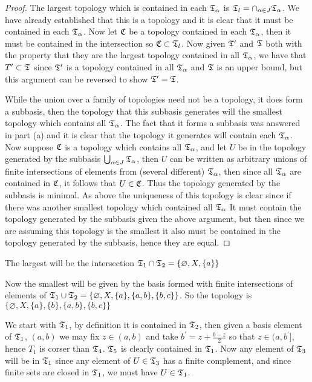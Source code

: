 \begin{alphaparts}
\begin{proof}
    The largest topology which is contained in each $\mathfrak{T}_\alpha$ is $\mathfrak{T}_l = \cap_{\alpha \in J } \mathfrak{T}_\alpha$. We have already established that this is a topology and it is clear that it must be contained in each $\mathfrak{T}_\alpha$. Now let $\mathfrak{C}$ be a topology 
    contained in each $\mathfrak{T}_\alpha$, then it must be contained in the intersection so $\mathfrak{C} \subset \mathfrak{T}_l$. Now given $\mathfrak{T}^\prime $ and $\mathfrak{T}$ both with the property that they are the largest topology contained in all $\mathfrak{T}_\alpha$, we have that 
    $T^\prime \subset \mathfrak{T}$ since $\mathfrak{T}^\prime$ is a topology contained in all $\mathfrak{T}_\alpha$ and $\mathfrak{T}$ is an upper bound, but this argument can be reversed to show $\mathfrak{T}^\prime = \mathfrak{T}$. 

    While the union over a family of topologies need not be a topology, it does form a subbasis, then the topology that this subbasis generates will the smallest topology which contains all $\mathfrak{T}_\alpha$. The fact that it forms a subbasis was answered in part (a) and 
    it is clear that the topology it generates will contain each $\mathfrak{T}_\alpha$. Now suppose $\mathfrak{C}$ is a topology which contains all $\mathfrak{T}_\alpha$, and let $U$ be in the topology generated by the subbasis $\bigcup_{\alpha \in J} \mathfrak{T}_\alpha$, then $U$ can be written as 
    arbitrary unions of finite intersections of elements from (several different) $\mathfrak{T}_\alpha$, then since all $\mathfrak{T}_\alpha$ are contained in $\mathfrak{C}$, it follows that $U \in \mathfrak{C}$. Thus the topology generated by the subbasis is minimal. As above the uniqueness of this topology is 
    clear since if there was another smallest topology which contained all $\mathfrak{T}_\alpha$ It must contain the topology generated by the subbasis given the above argument, but then since we are assuming this topology is the smallest it also must be contained in the topology generated by 
    the subbasis, hence they are equal. 
\end{proof}

\questionpart
The largest will be the intersection $\mathfrak{T}_1 \cap \mathfrak{T}_2 = \{\varnothing, X, \{a\}\}$

Now the smallest will be given by the basis formed with finite intersections of elements of $\mathfrak{T}_1 \cup \mathfrak{T}_2 = \{\varnothing, X, \{a\}, \{a, b\}, \{b, c \}\}$. 
So the topology is $ \{\varnothing, X, \{a\}, \{b\}, \{a, b\}, \{b, c\}\}$
\end{alphaparts}

\question 
We start with $\mathfrak{T}_1$, by definition it is contained in $\mathfrak{T}_2$, then given a basis element of $\mathfrak{T}_1$, $(a, b)$ we may fix $z \in (a, b)$ and take $b^\prime = z + \frac{b-z}{2}$ so that $z \in (a, b^\prime]$, hence $T_1$ is corser than $\mathfrak{T}_4$. $\mathfrak{T}_5$ is clearly contained in $\mathfrak{T}_1$. 
Now any element of $\mathfrak{T}_3$ will be in $\mathfrak{T}_1$ since any element of $U \in \mathfrak{T}_3$ has a finite complement, and since finite sets are closed in $\mathfrak{T}_1$, we must have $U \in \mathfrak{T}_1$. 

